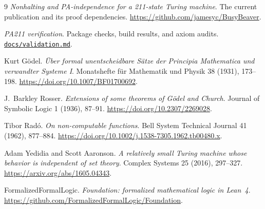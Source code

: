 \documentclass[11pt,letterpaper]{article}
\newcommand{\src}[2]{\href{https://github.com/jamesyc/BusyBeaver/blob/main/#1}{\texttt{\nolinkurl{#2}}}}
\begin{document}
\begin{thebibliography}{9}
\small
{}
\emph{Nonhalting and PA-independence for a 211-state Turing
machine}. The current publication and its proof dependencies.
\url{https://github.com/jamesyc/BusyBeaver}.

\emph{PA211 verification}. Package checks, build results, and axiom audits.
\src{docs/validation.md}{docs/validation.md}.

Kurt G\"odel. \emph{\"Uber formal unentscheidbare S\"atze der Principia
Mathematica und verwandter Systeme I}. Monatshefte f\"ur Mathematik und
Physik 38 (1931), 173--198.
\url{https://doi.org/10.1007/BF01700692}.

J.~Barkley Rosser. \emph{Extensions of some theorems of G\"odel and Church}.
Journal of Symbolic Logic 1 (1936), 87--91.
\url{https://doi.org/10.2307/2269028}.

Tibor Rad\'o. \emph{On non-computable functions}. Bell System Technical
Journal 41 (1962), 877--884.
\url{https://doi.org/10.1002/j.1538-7305.1962.tb00480.x}.

Adam Yedidia and Scott Aaronson. \emph{A relatively small Turing machine
whose behavior is independent of set theory}. Complex Systems 25 (2016),
297--327. \url{https://arxiv.org/abs/1605.04343}.

FormalizedFormalLogic. \emph{Foundation: formalized mathematical logic in
Lean~4}. \url{https://github.com/FormalizedFormalLogic/Foundation}.

\end{thebibliography}
\end{document}

